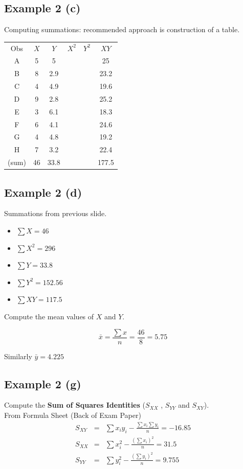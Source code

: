 \documentclass[]{report}
\begin{document}
\subsection{Example 2 (c)}
Computing summations: recommended approach is construction of a table.\\
\begin{center}
	\begin{tabular}{|c|c|c|c|c|c|}
		\hline
		Obs&$X$&$Y$&$X^2$&$Y^2$&$XY$\\
		A &5&5&&&25      \\
		B &8&2.9&&&23.2\\
		C &4&4.9&&&19.6\\
		D &9&2.8&&&25.2\\
		E &3&6.1&&&18.3\\
		F &6&4.1&&&24.6\\
		G &4&4.8&&&19.2\\
		H &7&3.2&&&22.4\\
		(sum)&46&33.8&&&177.5\\
		
		\hline
	\end{tabular}
\end{center}



\subsection{Example 2 (d)}

Summations from previous slide.
\begin{itemize}
	\item $\sum X = 46$
	\item $\sum X^2 =296$
	\item $\sum Y = 33.8$
	\item $\sum Y^2 = 152.56$
	\item $\sum XY = 117.5$
\end{itemize}
Compute the mean values of $X$ and $Y$.

\[ \bar{x} = \frac{\sum x}{n} = \frac{46}{8} = 5.75 \]

Similarly $\bar{y} =   4.225$




\subsection{Example 2 (g)}
Compute the \textbf{Sum of Squares Identities} ($S_{XX}$ , $S_{YY}$ and $S_{XY}$).\\
\bigskip
From Formula Sheet (Back of Exam Paper)
\begin{eqnarray*}
	S_{XY} &=&
	\sum x_iy_i - \frac{\sum x_i\sum y_i}{n} = -16.85\\
	S_{XX} &=&
	\sum x_i^2 - \frac{(\sum x_i)^2}{n} = 31.5\\
	S_{YY} &=&
	\sum y_i^2 - \frac{(\sum y_i)^2}{n} = 9.755\\
\end{eqnarray*}
\end{document}
